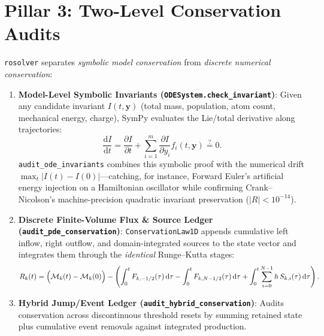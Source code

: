\documentclass[11pt,a4paper]{article}
\newcommand{\dd}{\mathrm{d}}
\newcommand{\pd}[2]{\frac{\partial #1}{\partial #2}}
\newcommand{\td}[2]{\frac{\dd #1}{\dd #2}}
\begin{document}
\section{Pillar 3: Two-Level Conservation Audits}

\texttt{rosolver} separates \emph{symbolic model conservation} from \emph{discrete numerical conservation}:
\begin{enumerate}[leftmargin=1.5em,itemsep=3pt]
  \item \textbf{Model-Level Symbolic Invariants (\texttt{ODESystem.check\_invariant})}: Given any candidate invariant $I(t, \mathbf{y})$ (total mass, population, atom count, mechanical energy, charge), SymPy evaluates the Lie/total derivative along trajectories:
  \begin{equation}
    \td{I}{t} = \pd{I}{t} + \sum_{i=1}^m \pd{I}{y_i} f_i(t, \mathbf{y}) \stackrel{?}{=} 0.
  \end{equation}
  \texttt{audit\_ode\_invariants} combines this symbolic proof with the numerical drift $\max_t |I(t) - I(0)|$—catching, for instance, Forward Euler's artificial energy injection on a Hamiltonian oscillator while confirming Crank--Nicolson's machine-precision quadratic invariant preservation ($|R| < 10^{-14}$).
  \item \textbf{Discrete Finite-Volume Flux \& Source Ledger (\texttt{audit\_pde\_conservation})}: \texttt{ConservationLaw1D} appends cumulative left inflow, right outflow, and domain-integrated sources to the state vector and integrates them through the \emph{identical} Runge--Kutta stages:
  \begin{equation}
    R_k(t) = \Bigl(\mathcal{M}_k(t) - \mathcal{M}_k(0)\Bigr) - \left(\int_0^t F_{k, -1/2}(\tau)\,\dd\tau - \int_0^t F_{k, N-1/2}(\tau)\,\dd\tau + \int_0^t \sum_{i=0}^{N-1} h\,S_{k,i}(\tau)\,\dd\tau\right).
  \end{equation}
  \item \textbf{Hybrid Jump/Event Ledger (\texttt{audit\_hybrid\_conservation})}: Audits conservation across discontinuous threshold resets by summing retained state plus cumulative event removals against integrated production.
\end{enumerate}
\end{document}
